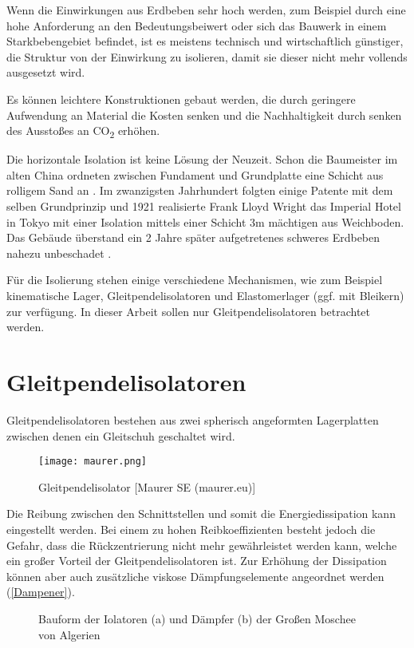 Wenn die Einwirkungen aus Erdbeben sehr hoch werden, zum Beispiel durch eine hohe Anforderung an den Bedeutungsbeiwert oder sich das Bauwerk in einem Starkbebengebiet befindet, ist es meistens technisch und wirtschaftlich günstiger, die Struktur von der Einwirkung zu isolieren, damit sie dieser nicht mehr vollends ausgesetzt wird.

Es können leichtere Konstruktionen gebaut werden, die durch geringere Aufwendung an Material die Kosten senken und die Nachhaltigkeit durch senken des Ausstoßes an CO\textsubscript{2} erhöhen.

Die horizontale Isolation ist keine Lösung der Neuzeit. Schon die Baumeister im alten China ordneten zwischen Fundament und Grundplatte eine Schicht aus rolligem Sand an \cite{Taylor}.
Im zwanzigsten Jahrhundert folgten einige Patente mit dem selben Grundprinzip und 1921 realisierte Frank Lloyd Wright das Imperial Hotel in Tokyo mit einer Isolation mittels einer Schicht 3m mächtigen aus Weichboden. Das Gebäude überstand ein 2 Jahre später aufgetretenes schweres Erdbeben nahezu unbeschadet \cite{Reitherman}.

Für die Isolierung stehen einige verschiedene Mechanismen, wie zum Beispiel kinematische Lager, Gleitpendelisolatoren und Elastomerlager (ggf. mit Bleikern) zur verfügung.
In dieser Arbeit sollen nur Gleitpendelisolatoren betrachtet werden.


\section{Gleitpendelisolatoren}
\label{sec:gleitisolatoren}

 Gleitpendelisolatoren bestehen aus zwei spherisch angeformten Lagerplatten zwischen denen ein Gleitschuh geschaltet wird.

\begin{figure}[H]
    \centering
    \texttt{[image: maurer.png]}
    \caption{Gleitpendelisolator [Maurer SE (maurer.eu)]}
\end{figure}

Die Reibung zwischen den Schnittstellen und somit die Energiedissipation kann eingestellt werden.
Bei einem zu hohen Reibkoeffizienten besteht jedoch die Gefahr, dass die Rückzentrierung nicht mehr gewährleistet werden kann, welche ein großer Vorteil der Gleitpendelisolatoren ist.
Zur Erhöhung der Dissipation können aber auch zusätzliche viskose Dämpfungselemente angeordnet werden (\cref{Dampener}).

\begin{figure}[h]
    \centering
    \qquad
    \caption{Bauform der Iolatoren (a) und Dämpfer (b) der Großen Moschee von Algerien \cite{AKK}}%
\end{figure}

